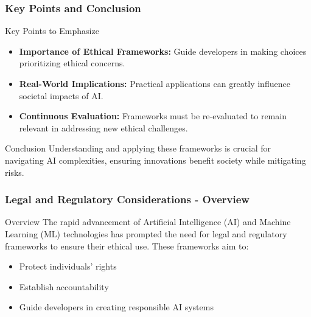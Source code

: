 \documentclass{beamer}
\begin{document}
\begin{frame}[fragile]
    \frametitle{Key Points and Conclusion}
    \begin{block}{Key Points to Emphasize}
        \begin{itemize}
            \item \textbf{Importance of Ethical Frameworks:} Guide developers in making choices prioritizing ethical concerns.
            \item \textbf{Real-World Implications:} Practical applications can greatly influence societal impacts of AI.
            \item \textbf{Continuous Evaluation:} Frameworks must be re-evaluated to remain relevant in addressing new ethical challenges.
        \end{itemize}
    \end{block}
    
    \begin{block}{Conclusion}
        Understanding and applying these frameworks is crucial for navigating AI complexities, ensuring innovations benefit society while mitigating risks.
    \end{block}
\end{frame}

\begin{frame}[fragile]
    \frametitle{Legal and Regulatory Considerations - Overview}
    \begin{block}{Overview}
        The rapid advancement of Artificial Intelligence (AI) and Machine Learning (ML) technologies has prompted the need for legal and regulatory frameworks to ensure their ethical use. 
        These frameworks aim to:
        \begin{itemize}
            \item Protect individuals' rights
            \item Establish accountability
            \item Guide developers in creating responsible AI systems
        \end{itemize}
    \end{block}
\end{frame}
\end{document}
